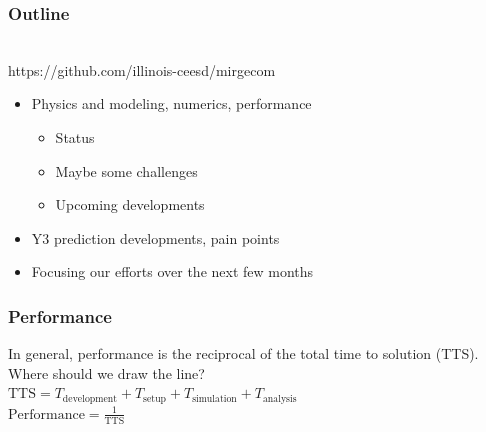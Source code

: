 \begin{frame}\frametitle{Outline}
\begin{center}
\mirgecom{}\\
https://github.com/illinois-ceesd/mirgecom
\end{center}
\vspace{15pt}
\begin{itemize}
\item Physics and modeling, numerics, performance 
  \begin{itemize}
  \item Status
  \item Maybe some challenges
  \item Upcoming developments
  \end{itemize}
\item Y3 prediction developments, pain points
\item Focusing our efforts over the next few months
\end{itemize}
\end{frame}

\begin{frame}\frametitle{Performance}
\begin{center}
In general, performance is the reciprocal of the total time to solution (TTS). Where should we draw the line?\\
\vspace{40pt}
$\text{TTS} = T_\text{development} + T_\text{setup} + T_\text{simulation} + T_\text{analysis}$\\ 
\vspace{20pt}
$\text{Performance} = \frac{1}{\text{TTS}}$
\end{center}
\end{frame}

